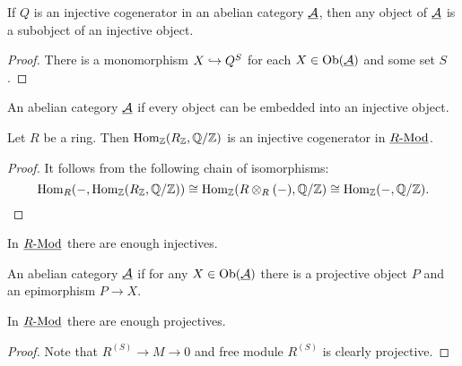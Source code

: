 \begin{proposition*}
	If \( Q \) is an injective cogenerator in an abelian category \( \underline{\mathcal A} \), then any object of \( \underline{\mathcal A} \) is a subobject of an injective object.
\end{proposition*}
\begin{proof}
	There is a monomorphism \( X \hookrightarrow Q^S \) for each \( X \in \operatorname{Ob}(\underline{\mathcal A}) \) and some set \( S \).
\end{proof}

\begin{definition*}
	An abelian category \( \underline{\mathcal A} \)  if every object can be embedded into an injective object.
\end{definition*}

\begin{proposition*}
	Let \( R \) be a ring. Then \( \operatorname{Hom}_\mathbb{Z}(R_\mathbb{Z}, \mathbb{Q}/\mathbb{Z}) \) is an injective cogenerator in \( \underline{R\text{-}\mathrm{Mod}} \).
\end{proposition*}
\begin{proof}
	It follows from the following chain of isomorphisms:
	\[\operatorname{Hom}_R(-, \operatorname{Hom}_\mathbb{Z}(R_\mathbb{Z}, \mathbb{Q}/\mathbb{Z})) \cong \operatorname{Hom}_\mathbb{Z}(R \otimes_R (-), \mathbb{Q}/\mathbb{Z}) \cong \operatorname{Hom}_\mathbb{Z}(-, \mathbb{Q}/\mathbb{Z}).\]
\end{proof}

\begin{corollary*}
	In \( \underline{R\text{-}\mathrm{Mod}} \) there are enough injectives.
\end{corollary*}

\begin{definition*}
	An abelian category \( \underline{\mathcal A} \)  if for any \( X \in \operatorname{Ob}(\underline{\mathcal A}) \) there is a projective object \( P \) and an epimorphism \( P \to X \).
\end{definition*}

\begin{proposition*}
	In \( \underline{R\text{-}\mathrm{Mod}} \) there are enough projectives.
\end{proposition*}
\begin{proof}
	Note that \( R^{(S)} \to M \to 0 \) and free module \( R^{(S)} \) is clearly projective.
\end{proof}

